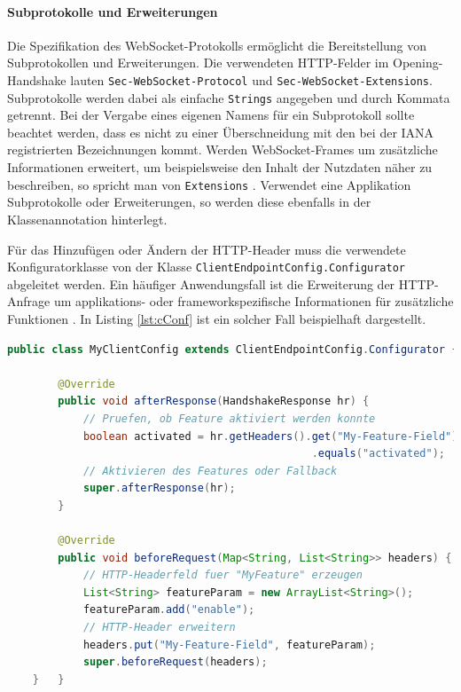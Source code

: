\documentclass[11pt,a4paper,titlepage]{scrartcl}
\numberwithin{equation}{section}
\begin{document}
\begin{mdframed}[hidealllines=true,backgroundcolor=lightgray!20]
\paragraph{Subprotokolle und Erweiterungen}
Die Spezifikation des WebSocket-Protokolls ermöglicht die Bereitstellung von Subprotokollen und Erweiterungen. Die verwendeten HTTP-Felder im Opening-Handshake lauten \texttt{Sec-WebSocket-Protocol} und \texttt{Sec-WebSocket-Extensions}. Subprotokolle werden dabei als einfache \texttt{Strings} angegeben und durch Kommata getrennt. Bei der Vergabe eines eigenen Namens für ein Subprotokoll sollte beachtet werden, dass es nicht zu einer Überschneidung mit den bei der IANA registrierten Bezeichnungen kommt. Werden WebSocket-Frames um zusätzliche Informationen erweitert, um beispielsweise den Inhalt der Nutzdaten näher zu beschreiben, so spricht man von \texttt{Extensions} \autocite[102]{coward_java_2014}. Verwendet eine Applikation Subprotokolle oder Erweiterungen, so werden diese ebenfalls in der Klassenannotation hinterlegt.\\
\end{mdframed}
\noindent Für das Hinzufügen oder Ändern der HTTP-Header muss die verwendete Konfiguratorklasse von der Klasse \texttt{ClientEndpointConfig.Configurator} abgeleitet werden. Ein häufiger Anwendungsfall ist die Erweiterung der HTTP-Anfrage um applikations- oder frameworkspezifische Informationen für zusätzliche Funktionen \autocite[104]{coward_java_2014}. In Listing \ref{lst:cConf} ist ein solcher Fall beispielhaft dargestellt.\medskip

\begin{lstlisting}[frame=single, language=Java, caption=Java: ClientEndpointConfig Konfigurationsklasse, label=lst:cConf]
	public class MyClientConfig extends ClientEndpointConfig.Configurator {

		@Override
		public void afterResponse(HandshakeResponse hr) {
			// Pruefen, ob Feature aktiviert werden konnte
			boolean activated = hr.getHeaders().get("My-Feature-Field").get(0)
												.equals("activated"); 	
			// Aktivieren des Features oder Fallback
			super.afterResponse(hr);
		}

		@Override
		public void beforeRequest(Map<String, List<String>> headers) {
			// HTTP-Headerfeld fuer "MyFeature" erzeugen
			List<String> featureParam = new ArrayList<String>();
			featureParam.add("enable");
			// HTTP-Header erweitern
			headers.put("My-Feature-Field", featureParam);
			super.beforeRequest(headers);
	}	}
\end{lstlisting}
\end{document}
